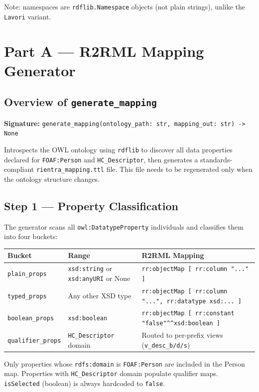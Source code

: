 ﻿\documentclass[12pt,a4paper]{article}
\begin{document}
Note: namespaces are \texttt{rdflib.Namespace} objects (not plain strings), unlike the \texttt{Lavori} variant.

\clearpage
\section{Part A --- R2RML Mapping Generator}

\subsection{Overview of \texttt{generate\_mapping}}

\textbf{Signature:} \texttt{generate\_mapping(ontology\_path: str, mapping\_out: str) -> None}

Introspects the OWL ontology using \texttt{rdflib} to discover all data properties declared for \texttt{FOAF:Person} and \texttt{HC\_Descriptor}, then generates a standards-compliant \texttt{rientra\_mapping.ttl} file. This file needs to be regenerated only when the ontology structure changes.

\subsection{Step 1 --- Property Classification}

The generator scans all \texttt{owl:DatatypeProperty} individuals and classifies them into four buckets:

\begin{longtable}{@{}P{3.5cm}P{2.5cm}P{8.5cm}@{}}
\toprule
\textbf{Bucket} & \textbf{Range} & \textbf{R2RML Mapping} \\
\midrule
\endhead
\texttt{plain\_props} & \texttt{xsd:string} or \texttt{xsd:anyURI} or None & \texttt{rr:objectMap [ rr:column "..." ]} \\
\texttt{typed\_props} & Any other XSD type & \texttt{rr:objectMap [ rr:column "...", rr:datatype xsd:... ]} \\
\texttt{boolean\_props} & \texttt{xsd:boolean} & \texttt{rr:objectMap [ rr:constant "false"\^{}\^{}xsd:boolean ]} \\
\texttt{qualifier\_props} & \texttt{HC\_Descriptor} domain & Routed to per-prefix views (\texttt{v\_desc\_b/d/s}) \\
\bottomrule
\end{longtable}

Only properties whose \texttt{rdfs:domain} is \texttt{FOAF:Person} are included in the Person map. Properties with \texttt{HC\_Descriptor} domain populate qualifier maps. \texttt{isSelected} (boolean) is always hardcoded to \texttt{false}.
\end{document}
